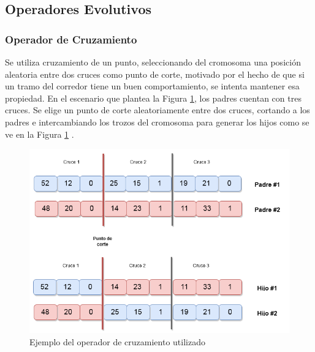 \subsection{Operadores Evolutivos}

\subsubsection{Operador de Cruzamiento}
Se utiliza cruzamiento de un punto, seleccionando del cromosoma una posición aleatoria entre dos cruces como punto de corte, motivado por el hecho de que si un tramo del corredor tiene un buen comportamiento, se intenta mantener esa propiedad. En el escenario que plantea la Figura \ref{fig:op_cruzamiento}, los padres cuentan con tres cruces. Se elige un punto de corte aleatoriamente entre dos cruces, cortando a los padres e intercambiando los trozos del cromosoma para generar los hijos como se ve en la Figura \ref{fig:op_cruzamiento} .


\begin{figure}[H]
	\centering
	\includegraphics[width=0.8\linewidth]{Figures/alg_cruzamiento}
	\caption{Ejemplo del operador de cruzamiento utilizado}
	\label{fig:op_cruzamiento}
\end{figure}



